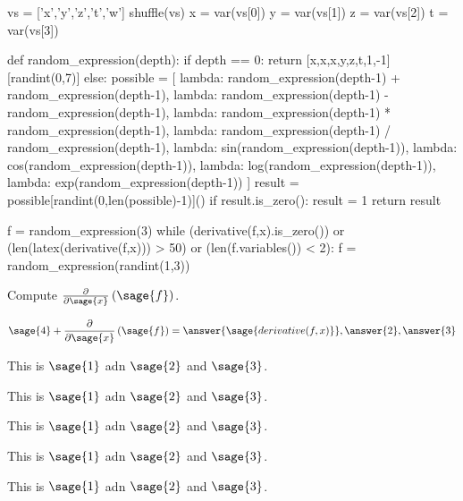 \documentclass{ximera}
\author{Jim Fowler}
\begin{document}
\begin{sagesilent}
  vs = ['x','y','z','t','w']
  shuffle(vs)
  x = var(vs[0])
  y = var(vs[1])
  z = var(vs[2])
  t = var(vs[3])  

  def random_expression(depth):
    if depth == 0:
      return [x,x,x,y,z,t,1,-1][randint(0,7)]
    else:
      possible = [
        lambda: random_expression(depth-1) + random_expression(depth-1),
        lambda: random_expression(depth-1) - random_expression(depth-1),
        lambda: random_expression(depth-1) * random_expression(depth-1),
        lambda: random_expression(depth-1) / random_expression(depth-1),
        lambda: sin(random_expression(depth-1)),
        lambda: cos(random_expression(depth-1)),
        lambda: log(random_expression(depth-1)),
        lambda: exp(random_expression(depth-1))
      ]
      result = possible[randint(0,len(possible)-1)]()
      if result.is_zero():
        result = 1
      return result

  f = random_expression(3)
  while (derivative(f,x).is_zero()) or (len(latex(derivative(f,x))) > 50) or (len(f.variables()) < 2):
    f = random_expression(randint(1,3))
  
\end{sagesilent}

\begin{exercise}

  Compute $\frac{\partial}{\partial\sage{x}} \left( \sage{f} \right)$.

  \begin{prompt}
    \[
      \sage{4} + \frac{\partial}{\partial\sage{x}} \left( \sage{f} \right) = \answer{\sage{derivative(f,x)}},\answer{2},\answer{3}
    \]
  \end{prompt}

  \begin{hint}
    This is $\sage{1}$ adn $\sage{2}$  and $\sage{3}$.
  \end{hint}

  \begin{hint}
    This is $\sage{1}$ adn $\sage{2}$  and $\sage{3}$.
  \end{hint}

  \begin{hint}
    This is $\sage{1}$ adn $\sage{2}$  and $\sage{3}$.
  \end{hint}
  \begin{hint}
    This is $\sage{1}$ adn $\sage{2}$  and $\sage{3}$.
  \end{hint}

  \begin{hint}
    This is $\sage{1}$ adn $\sage{2}$  and $\sage{3}$.
  \end{hint}  
  
\end{exercise}
\end{document}
